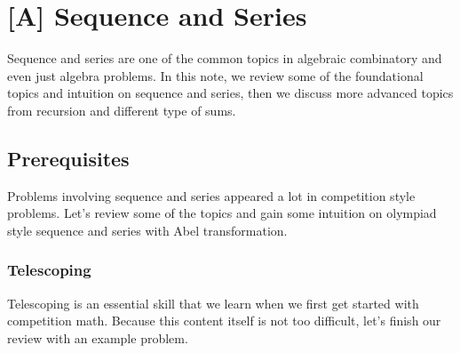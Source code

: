 \documentclass[../../../main.tex]{subfiles}
\begin{document}
\chapter{[A] Sequence and Series}

Sequence and series are one of the common topics in algebraic
combinatory and even just algebra problems. In this note, we review
some of the foundational topics and intuition on sequence and series,
then we discuss more advanced topics from recursion and different
type of sums.

\section{Prerequisites}

Problems involving sequence and series appeared a lot in competition
style problems. Let's review some of the topics and gain some
intuition on olympiad style sequence and series with Abel
transformation.

\subsection{Telescoping}

Telescoping is an essential skill that we learn when we first get
started with competition math. Because this content itself is
not too difficult, let's finish our review with an example problem.
\end{document}
